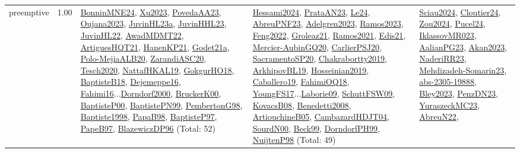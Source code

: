 {\begin{longtable}{p{3cm}r>{\raggedright\arraybackslash}p{6cm}>{\raggedright\arraybackslash}p{6cm}>{\raggedright\arraybackslash}p{8cm}}
\index{preemptive}\index{Concepts!preemptive}preemptive &  1.00 & \hyperref[detail:BonninMNE24]{BonninMNE24}, \hyperref[detail:Xu2023]{Xu2023}, \hyperref[detail:PovedaAA23]{PovedaAA23}, \hyperref[detail:Oujana2023]{Oujana2023}, \hyperref[detail:JuvinHL23a]{JuvinHL23a}, \hyperref[detail:JuvinHHL23]{JuvinHHL23}, \hyperref[detail:JuvinHL22]{JuvinHL22}, \hyperref[detail:AwadMDMT22]{AwadMDMT22}, \hyperref[detail:ArtiguesHQT21]{ArtiguesHQT21}, \hyperref[detail:HanenKP21]{HanenKP21}, \hyperref[detail:Godet21a]{Godet21a}, \hyperref[detail:Polo-MejiaALB20]{Polo-MejiaALB20}, \hyperref[detail:ZarandiASC20]{ZarandiASC20}, \hyperref[detail:Tesch2020]{Tesch2020}, \hyperref[detail:NattafHKAL19]{NattafHKAL19}, \hyperref[detail:GokgurHO18]{GokgurHO18}, \hyperref[detail:BaptisteB18]{BaptisteB18}, \hyperref[detail:Dejemeppe16]{Dejemeppe16}, \hyperref[detail:Fahimi16]{Fahimi16}...\hyperref[detail:Dorndorf2000]{Dorndorf2000}, \hyperref[detail:BruckerK00]{BruckerK00}, \hyperref[detail:BaptisteP00]{BaptisteP00}, \hyperref[detail:BaptistePN99]{BaptistePN99}, \hyperref[detail:PembertonG98]{PembertonG98}, \hyperref[detail:Baptiste1998]{Baptiste1998}, \hyperref[detail:PapaB98]{PapaB98}, \hyperref[detail:BaptisteP97]{BaptisteP97}, \hyperref[detail:PapeB97]{PapeB97}, \hyperref[detail:BlazewiczDP96]{BlazewiczDP96} (Total: 52) & \hyperref[detail:Hessami2024]{Hessami2024}, \hyperref[detail:PrataAN23]{PrataAN23}, \hyperref[detail:Le24]{Le24}, \hyperref[detail:AbreuPNF23]{AbreuPNF23}, \hyperref[detail:Adelgren2023]{Adelgren2023}, \hyperref[detail:Ramos2023]{Ramos2023}, \hyperref[detail:Feng2022]{Feng2022}, \hyperref[detail:Groleaz21]{Groleaz21}, \hyperref[detail:Ramos2021]{Ramos2021}, \hyperref[detail:Edis21]{Edis21}, \hyperref[detail:Mercier-AubinGQ20]{Mercier-AubinGQ20}, \hyperref[detail:CarlierPSJ20]{CarlierPSJ20}, \hyperref[detail:SacramentoSP20]{SacramentoSP20}, \hyperref[detail:Chakrabortty2019]{Chakrabortty2019}, \hyperref[detail:ArkhipovBL19]{ArkhipovBL19}, \hyperref[detail:Hosseinian2019]{Hosseinian2019}, \hyperref[detail:Caballero19]{Caballero19}, \hyperref[detail:FahimiOQ18]{FahimiOQ18}, \hyperref[detail:YoungFS17]{YoungFS17}...\hyperref[detail:Laborie09]{Laborie09}, \hyperref[detail:SchuttFSW09]{SchuttFSW09}, \hyperref[detail:KovacsB08]{KovacsB08}, \hyperref[detail:Benedetti2008]{Benedetti2008}, \hyperref[detail:ArtiouchineB05]{ArtiouchineB05}, \hyperref[detail:CambazardHDJT04]{CambazardHDJT04}, \hyperref[detail:SourdN00]{SourdN00}, \hyperref[detail:Beck99]{Beck99}, \hyperref[detail:DorndorfPH99]{DorndorfPH99}, \hyperref[detail:NuijtenP98]{NuijtenP98} (Total: 49) & \hyperref[detail:Sciau2024]{Sciau2024}, \hyperref[detail:Cloutier24]{Cloutier24}, \hyperref[detail:Zou2024]{Zou2024}, \hyperref[detail:Pucel24]{Pucel24}, \hyperref[detail:IklassovMR023]{IklassovMR023}, \hyperref[detail:AalianPG23]{AalianPG23}, \hyperref[detail:Akan2023]{Akan2023}, \hyperref[detail:NaderiRR23]{NaderiRR23}, \hyperref[detail:Mehdizadeh-Somarin23]{Mehdizadeh-Somarin23}, \hyperref[detail:abs-2305-19888]{abs-2305-19888}, \hyperref[detail:Bley2023]{Bley2023}, \hyperref[detail:PenzDN23]{PenzDN23}, \hyperref[detail:YuraszeckMC23]{YuraszeckMC23}, \hyperref[detail:AbreuN22]{AbreuN22}, 
\end{longtable}}
